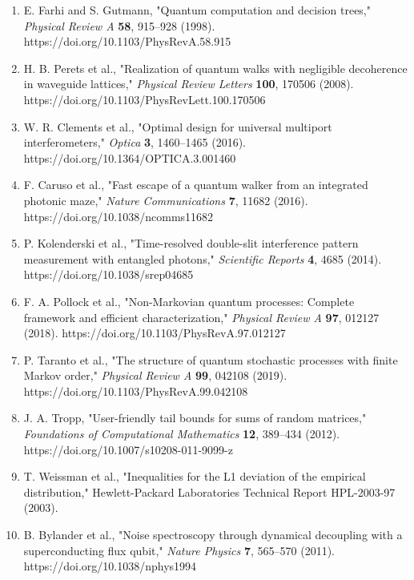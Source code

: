 \documentclass[11pt,a4paper,openany]{report}
\begin{document}
\begin{enumerate}
\item 
E. Farhi and S. Gutmann, "Quantum computation and decision trees," \emph{Physical Review A} \textbf{58}, 915--928 (1998). https:/\allowbreak{}/\allowbreak{}doi.org/\allowbreak{}10.1103/\allowbreak{}PhysRevA.58.915

\item 
H. B. Perets et al., "Realization of quantum walks with negligible decoherence in waveguide lattices," \emph{Physical Review Letters} \textbf{100}, 170506 (2008). https:/\allowbreak{}/\allowbreak{}doi.org/\allowbreak{}10.1103/\allowbreak{}PhysRevLett.100.170506

\item 
W. R. Clements et al., "Optimal design for universal multiport interferometers," \emph{Optica} \textbf{3}, 1460--1465 (2016). https:/\allowbreak{}/\allowbreak{}doi.org/\allowbreak{}10.1364/\allowbreak{}OPTICA.3.001460

\item 
F. Caruso et al., "Fast escape of a quantum walker from an integrated photonic maze," \emph{Nature Communications} \textbf{7}, 11682 (2016). https:/\allowbreak{}/\allowbreak{}doi.org/\allowbreak{}10.1038/\allowbreak{}ncomms11682

\item 
P. Kolenderski et al., "Time-resolved double-slit interference pattern measurement with entangled photons," \emph{Scientific Reports} \textbf{4}, 4685 (2014). https:/\allowbreak{}/\allowbreak{}doi.org/\allowbreak{}10.1038/\allowbreak{}srep04685

\item 
F. A. Pollock et al., "Non-Markovian quantum processes: Complete framework and efficient characterization," \emph{Physical Review A} \textbf{97}, 012127 (2018). https:/\allowbreak{}/\allowbreak{}doi.org/\allowbreak{}10.1103/\allowbreak{}PhysRevA.97.012127

\item 
P. Taranto et al., "The structure of quantum stochastic processes with finite Markov order," \emph{Physical Review A} \textbf{99}, 042108 (2019). https:/\allowbreak{}/\allowbreak{}doi.org/\allowbreak{}10.1103/\allowbreak{}PhysRevA.99.042108

\item 
J. A. Tropp, "User-friendly tail bounds for sums of random matrices," \emph{Foundations of Computational Mathematics} \textbf{12}, 389--434 (2012). https:/\allowbreak{}/\allowbreak{}doi.org/\allowbreak{}10.1007/\allowbreak{}s10208-011-9099-z

\item 
T. Weissman et al., "Inequalities for the L1 deviation of the empirical distribution," Hewlett-Packard Laboratories Technical Report HPL-2003-97 (2003).

\item 
B. Bylander et al., "Noise spectroscopy through dynamical decoupling with a superconducting flux qubit," \emph{Nature Physics} \textbf{7}, 565--570 (2011). https:/\allowbreak{}/\allowbreak{}doi.org/\allowbreak{}10.1038/\allowbreak{}nphys1994

\end{enumerate}
\end{document}
